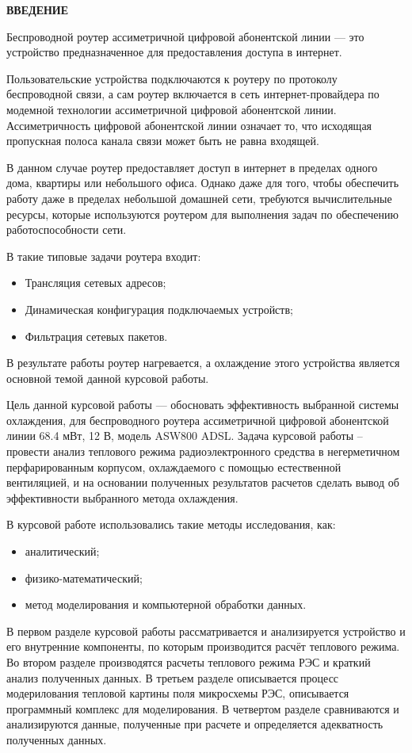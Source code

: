 \begin{center}
\textbf{ВВЕДЕНИЕ}
\end{center}

\par
Беспроводной роутер ассиметричной цифровой абонентской линии — это
устройство предназначенное для предоставления доступа в интернет.
\par
Пользовательские устройства подключаются к роутеру по протоколу
беспроводной связи, а сам роутер включается в сеть интернет-провайдера
по модемной технологии ассиметричной цифровой абонентской линии.
Ассиметричность цифровой абонентской линии означает то, что исходящая
пропускная полоса канала связи может быть не равна входящей.
\par
В данном случае роутер предоставляет доступ в интернет в пределах
одного дома, квартиры или небольшого офиса.
Однако даже для того, чтобы обеспечить работу даже в пределах
небольшой домашней сети, требуются вычислительные ресурсы,
которые используются роутером для выполнения задач
по обеспечению работоспособности сети.
\par
В такие типовые задачи роутера входит:
\begin{itemize}[nosep]

\item Трансляция сетевых адресов;
\item Динамическая конфигурация подключаемых устройств;
\item Фильтрация сетевых пакетов.
\end{itemize}
\par
В результате работы роутер нагревается, а охлаждение этого устройства
является основной темой данной курсовой работы.
\par
Цель данной курсовой работы — обосновать эффективность выбранной
системы охлаждения, для беспроводного роутера ассиметричной цифровой
абонентской линии 68.4 мВт, 12 В, модель ASW800 ADSL.
Задача курсовой работы – провести анализ теплового режима
радиоэлектронного средства в негерметичном перфарированным корпусом,
охлаждаемого с помощью естественной вентиляцией, и на основании
полученных результатов расчетов сделать вывод об эффективности
выбранного метода охлаждения.
\par
В курсовой работе использовались такие методы исследования, как:
\begin{itemize}[nosep]
\item аналитический;
\item физико-математический;
\item метод моделирования и компьютерной обработки данных.  
\end{itemize}

\par
В первом разделе курсовой работы рассматривается и анализируется
устройство и его внутренние компоненты, по которым производится
расчёт теплового режима. Во втором разделе производятся расчеты
теплового режима РЭС и краткий анализ полученных данных.
В третьем разделе описывается процесс модерилования тепловой
картины поля микросхемы РЭС, описывается программный комплекс для моделирования.
В четвертом разделе сравниваются и анализируются данные, полученные при расчете
и определяется адекватность полученных данных.

\newpage